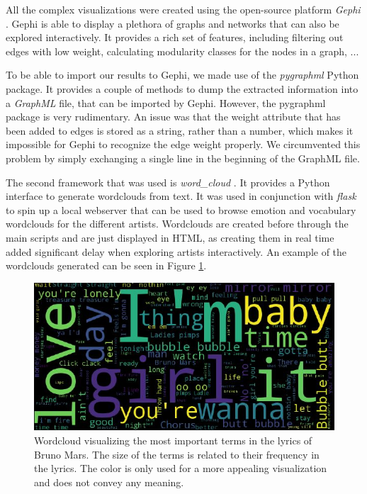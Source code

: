 \documentclass[10pt,a4paper]{article}
\begin{document}
	All the complex visualizations were created using the open-source platform \textit{Gephi} \cite{ICWSM09154}. Gephi is able to display a plethora of graphs and networks that can also be explored interactively. It provides a rich set of features, including filtering out edges with low weight, calculating modularity classes for the nodes in a graph, ... 
	
	To be able to import our results to Gephi, we made use of the \textit{pygraphml} Python package. It provides a couple of methods to dump the extracted information into a \textit{GraphML} file, that can be imported by Gephi. However, the pygraphml package is very rudimentary. An issue was that the weight attribute that has been added to edges is stored as a string, rather than a number, which makes it impossible for Gephi to recognize the edge weight properly. We circumvented this problem by simply exchanging a single line in the beginning of the GraphML file.
	
	The second framework that was used is \textit{word\_cloud} \cite{wordcloud}. It provides a Python interface to generate wordclouds from text. It was used in conjunction with \textit{flask} \cite{flask} to spin up a local webserver that can be used to browse emotion and vocabulary wordclouds for the different artists. Wordclouds are created before through the main scripts and are just displayed in HTML, as creating them in real time added significant delay when exploring artists interactively. An example of the wordclouds generated can be seen in Figure \ref{fig:wordcloud}.
	
	\begin{figure}[htb]
		\centering
		\includegraphics[width=\linewidth]{data/wordcloud}
		\caption{Wordcloud visualizing the most important terms in the lyrics of Bruno Mars. The size of the terms is related to their frequency in the lyrics. The color is only used for a more appealing visualization and does not convey any meaning.}
		\label{fig:wordcloud}
	\end{figure}
	
\end{document}
